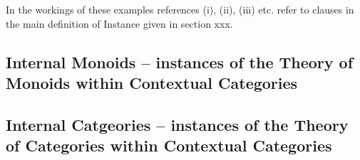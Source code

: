 \documentclass[10pt,a4paper]{article}
\theoremstyle{remark}
\begin{document}
In the workings of these examples references (i), (ii), (iii) etc. refer to clauses in the main definition of Instance given in section xxx.

\subsection{Internal Monoids -- instances of the Theory of Monoids within Contextual Categories}
\label{monoidsinstanceexample} 
 


\subsection{Internal Catgeories -- instances of the Theory of Categories within Contextual Categories}

\label{categoriesinstanceexample}


%

% 


\end{document}

